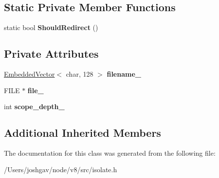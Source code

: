 \subsection*{Static Private Member Functions}
\begin{DoxyCompactItemize}
\item 
static bool {\bfseries Should\+Redirect} ()\hypertarget{classv8_1_1internal_1_1_code_tracer_a08c6306f7b57af7859af8768d3085418}{}\label{classv8_1_1internal_1_1_code_tracer_a08c6306f7b57af7859af8768d3085418}

\end{DoxyCompactItemize}
\subsection*{Private Attributes}
\begin{DoxyCompactItemize}
\item 
\hyperlink{classv8_1_1internal_1_1_embedded_vector}{Embedded\+Vector}$<$ char, 128 $>$ {\bfseries filename\+\_\+}\hypertarget{classv8_1_1internal_1_1_code_tracer_a1a13935c9ccc902b81672f86ff89e582}{}\label{classv8_1_1internal_1_1_code_tracer_a1a13935c9ccc902b81672f86ff89e582}

\item 
F\+I\+LE $\ast$ {\bfseries file\+\_\+}\hypertarget{classv8_1_1internal_1_1_code_tracer_a64b156428cbc3c68e914612bc987b13d}{}\label{classv8_1_1internal_1_1_code_tracer_a64b156428cbc3c68e914612bc987b13d}

\item 
int {\bfseries scope\+\_\+depth\+\_\+}\hypertarget{classv8_1_1internal_1_1_code_tracer_a925257c3ee8d243beed247cccc71b264}{}\label{classv8_1_1internal_1_1_code_tracer_a925257c3ee8d243beed247cccc71b264}

\end{DoxyCompactItemize}
\subsection*{Additional Inherited Members}


The documentation for this class was generated from the following file\+:\begin{DoxyCompactItemize}
\item 
/\+Users/joshgav/node/v8/src/isolate.\+h\end{DoxyCompactItemize}
